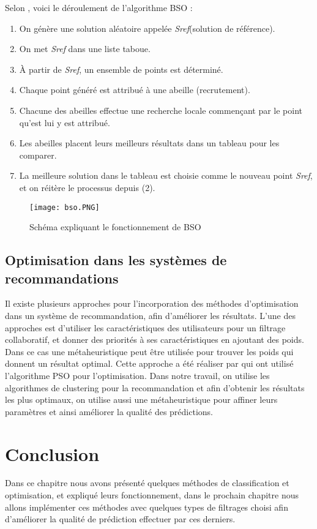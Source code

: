 Selon \cite{ref34}, voici le déroulement de l’algorithme BSO :
\begin{enumerate}

\item	On génère une solution aléatoire appelée \textit{Sref}(solution de référence).
\item	On met \textit{Sref} dans une liste taboue.
\item	À partir de \textit{Sref}, un ensemble de points est déterminé.
\item	Chaque point généré est attribué à une abeille (recrutement).
\item	Chacune des abeilles effectue une recherche locale commençant par le point qu’est lui y est attribué.
\item	Les abeilles placent leurs meilleurs résultats dans un tableau pour les comparer.
\item	La meilleure solution dans le tableau est choisie comme le nouveau point \textit{Sref}, et on réitère le processus depuis (2). 
\end{enumerate}
\begin{figure}[H]
	\centering
	\texttt{[image: bso.PNG]}
	\caption{ Schéma expliquant le fonctionnement de BSO \cite{ref34} }
\end{figure}
\subsection{Optimisation dans les systèmes de recommandations}
Il existe plusieurs approches pour l'incorporation des méthodes d’optimisation dans un système de recommandation, afin d’améliorer les résultats.
L’une des approches est d’utiliser les caractéristiques des utilisateurs pour un filtrage collaboratif, et donner des priorités à ses caractéristiques en ajoutant des poids. Dans ce cas une métaheuristique peut être utilisée pour trouver les poids qui donnent un résultat optimal. Cette approche a été réaliser par \cite{ref31} qui ont utilisé l’algorithme PSO pour l’optimisation. Dans notre travail, on utilise les algorithmes de clustering pour la recommandation et afin d'obtenir les résultats les plus optimaux, on utilise aussi une métaheuristique pour affiner leurs paramètres et ainsi améliorer la qualité des prédictions.
\section {Conclusion}
Dans ce chapitre nous avons présenté quelques méthodes de classification et optimisation, et expliqué leurs fonctionnement, dans le prochain chapitre nous allons implémenter ces méthodes avec quelques types de filtrages choisi afin d'améliorer la qualité de prédiction effectuer par ces derniers.

